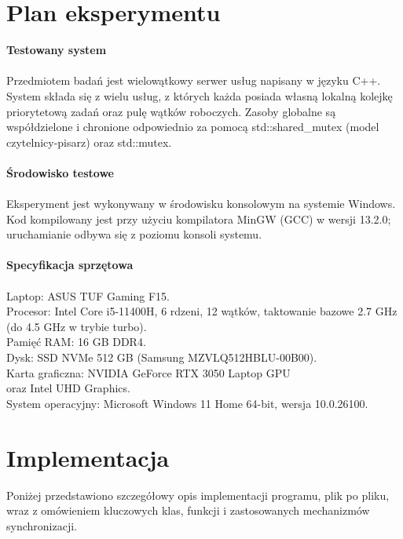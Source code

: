 \documentclass[a4paper,12pt]{article}
\begin{document}
    \section{Plan eksperymentu}
        \vspace{1em}
        \textbf{Testowany system}\\
        \vspace{-0.5em}\\
        Przedmiotem badań jest wielowątkowy serwer usług napisany w języku C++. System składa się z wielu usług, z których każda posiada własną lokalną kolejkę priorytetową zadań oraz pulę wątków roboczych. Zasoby globalne są współdzielone i chronione odpowiednio za pomocą std::shared\_mutex (model czytelnicy-pisarz) oraz std::mutex.\\
        \vspace{0.5em}\\
        \textbf{Środowisko testowe}\\
        \vspace{-0.5em}\\
        Eksperyment jest wykonywany w środowisku konsolowym na systemie Windows. Kod kompilowany jest przy użyciu kompilatora MinGW (GCC) w wersji 13.2.0; uruchamianie odbywa się z poziomu konsoli systemu.\\
        \vspace{0.5em}\\
        \textbf{Specyfikacja sprzętowa}\\
        \vspace{-0.5em}\\
        Laptop: ASUS TUF Gaming F15.\\
        Procesor: Intel Core i5-11400H, 6 rdzeni, 12 wątków, taktowanie bazowe 2.7 GHz (do 4.5 GHz w trybie turbo).\\
        Pamięć RAM: 16 GB DDR4.\\
        Dysk: SSD NVMe 512 GB (Samsung MZVLQ512HBLU-00B00).\\
        Karta graficzna: NVIDIA GeForce RTX 3050 Laptop GPU\\oraz Intel UHD Graphics.\\
        System operacyjny: Microsoft Windows 11 Home 64-bit, wersja 10.0.26100.
    \newpage
    \vspace*{1em}
    \section{Implementacja}
        \vspace{1em}
        Poniżej przedstawiono szczegółowy opis implementacji programu, plik po pliku, wraz z omówieniem kluczowych klas, funkcji i zastosowanych mechanizmów synchronizacji.
        \vspace{1em}
\end{document}
